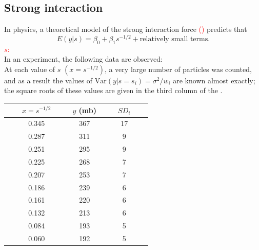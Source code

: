 \documentclass[14pt]{extarticle}
\begin{document}
\subsection*{Strong interaction}
\noindent
In physics, a theoretical model of the strong interaction force \textcolor{red}{()} predicts that
\[
E(y | s) = \beta_0 + \beta_1 s^{-1/2} + \text{relatively small terms}.
\]
\textcolor{red}{$s$: }\\
In an experiment, the following data are observed:\\
At each value of \( s \) \((x = s^{-1/2})\), a very large number of particles was counted, and as a result the values of \( \text{Var}(y | s = s_i) = \sigma^2 / w_i \) are known almost exactly; the square roots of these values are given in the third column of the \textcolor{red}{}.

\begin{table}[h!]
\centering
{}
\begin{tabular}{ccc}
\hline
$\quad \quad  x = s^{-1/2}\quad \quad$ & \quad \quad $y$ (mb)\quad \quad  & $\quad \quad  SD_i\quad \quad$ \\
\hline
0.345 & 367 & 17 \\
0.287 & 311 & 9 \\
0.251 & 295 & 9 \\
0.225 & 268 & 7 \\
0.207 & 253 & 7 \\
0.186 & 239 & 6 \\
0.161 & 220 & 6 \\
0.132 & 213 & 6 \\
0.084 & 193 & 5 \\
0.060 & 192 & 5 \\
\hline
\end{tabular}
\end{table}
\end{document}

